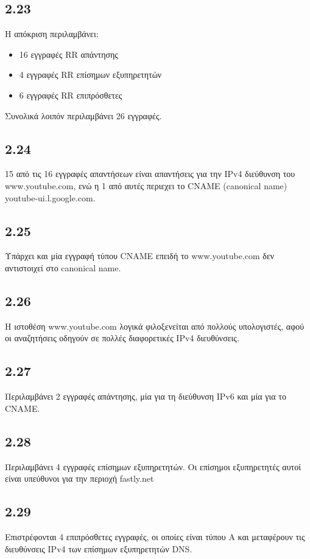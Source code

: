 		\subsection*{2.23} 
			Η απόκριση περιλαμβάνει:
			
			\begin{itemize}
				\item 16 εγγραφές RR απάντησης
				\item 4 εγγραφές RR επίσημων εξυπηρετητών
				\item 6 εγγραφές RR επιπρόσθετες
			\end{itemize}
		
			Συνολικά λοιπόν περιλαμβάνει 26 εγγραφές.
			
		\subsection*{2.24} 
			15 από τις 16 εγγραφές απαντήσεων είναι απαντήσεις για την IPv4 διεύθυνση του www.youtube.com, ενώ η 1 από αυτές περιεχει το CNAME (canonical name) youtube-ui.l.google.com.

		\subsection*{2.25} 
			Υπάρχει και μία εγγραφή τύπου CNAME επειδή το www.youtube.com δεν αντιστοιχεί στο canonical name.

		\subsection*{2.26} 
			Η ιστοθέση www.youtube.com λογικά φιλοξενείται από πολλούς υπολογιστές, αφού οι αναζητήσεις οδηγούν σε πολλές διαφορετικές IPv4 διευθύνσεις.

		\subsection*{2.27} 
			Περιλαμβάνει 2 εγγραφές απάντησης, μία για τη διεύθυνση IPv6 και μία για το CNAME.

		\subsection*{2.28} 
			Περιλαμβάνει 4 εγγραφές επίσημων εξυπηρετητών. Οι επίσημοι εξυπηρετητές αυτοί είναι υπεύθυνοι για την περιοχή fastly.net

		\subsection*{2.29} 
			Επιστρέφονται 4 επιπρόσθετες εγγραφές, οι οποίες είναι τύπου A και μεταφέρουν τις διευθύνσεις IPv4 των επίσημων εξυπηρετητών DNS.

